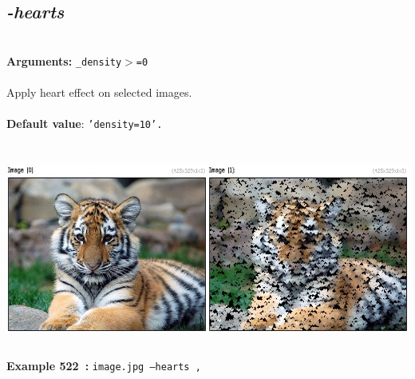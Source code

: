 \documentclass[a4paper,11pt,twoside]{book}
\begin{document}
\subsection{\emph{-hearts} }\vspace*{-0.5em}
~\\\textbf{Arguments: } 
{\small \texttt{\_density$>$=0}}\\~\\
Apply heart effect on selected images.
~\\~\\\textbf{Default value}: {\small \texttt{'density=10'.}}
\begin{center}\includegraphics[keepaspectratio=true,height=7cm,width=\textwidth]{img/gmic_def522.jpg}\\
{\footnotesize \textbf{Example 522~:} \texttt{image.jpg --hearts ,}}
\end{center}
\end{document}

